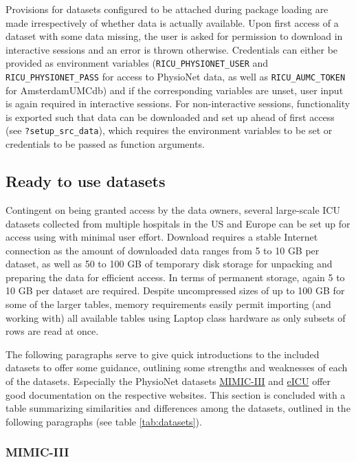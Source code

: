 \documentclass[
]{jss}
\begin{document}
Provisions for datasets configured to be attached during package loading
are made irrespectively of whether data is actually available. Upon
first access of a dataset with some data missing, the user is asked for
permission to download in interactive sessions and an error is thrown
otherwise. Credentials can either be provided as environment variables
(\texttt{RICU\_PHYSIONET\_USER} and \texttt{RICU\_PHYSIONET\_PASS} for
access to PhysioNet data, as well as \texttt{RICU\_AUMC\_TOKEN} for
AmsterdamUMCdb) and if the corresponding variables are unset, user input
is again required in interactive sessions. For non-interactive sessions,
functionality is exported such that data can be downloaded and set up
ahead of first access (see \texttt{?setup\_src\_data}), which requires
the environment variables to be set or credentials to be passed as
function arguments.

\hypertarget{ready-to-use-datasets}{%
\subsection{Ready to use datasets}\label{ready-to-use-datasets}}

Contingent on being granted access by the data owners, several
large-scale ICU datasets collected from multiple hospitals in the US and
Europe can be set up for access using  with minimal user
effort. Download requires a stable Internet connection as the amount of
downloaded data ranges from 5 to 10 GB per dataset, as well as 50 to 100
GB of temporary disk storage for unpacking and preparing the data for
efficient access. In terms of permanent storage, again 5 to 10 GB per
dataset are required. Despite uncompressed sizes of up to 100 GB for
some of the larger tables, memory requirements easily permit importing
(and working with) all available tables using Laptop class hardware as
only subsets of rows are read at once.

The following paragraphs serve to give quick introductions to the
included datasets to offer some guidance, outlining some strengths and
weaknesses of each of the datasets. Especially the PhysioNet datasets
\href{https://mimic.physionet.org/about/mimic/}{MIMIC-III} and
\href{https://eicu-crd.mit.edu/about/eicu/}{eICU} offer good
documentation on the respective websites. This section is concluded with
a table summarizing similarities and differences among the datasets,
outlined in the following paragraphs (see table \ref{tab:datasets}).

\hypertarget{mimic-iii}{%
\subsubsection{MIMIC-III}\label{mimic-iii}}
\end{document}
